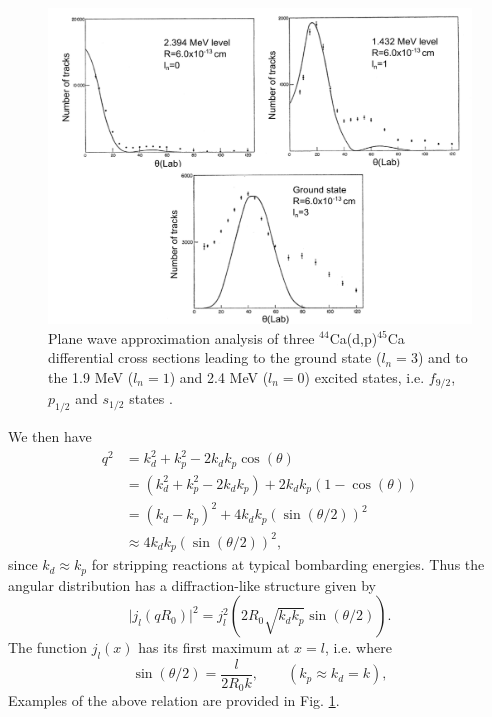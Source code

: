 \begin{figure}
\centerline{\includegraphics*[width=15cm,angle=0]{C6/figs_C6/fig6_F2}}
\caption{Plane wave approximation analysis of three $^{44}$Ca(d,p)$^{45}$Ca differential cross sections leading to the ground state ($l_n=3$) and to the 1.9 MeV  ($l_n=1$) and 2.4 MeV ($l_n=0$) excited states, i.e.  $f_{9/2}$, $p_{1/2}$ and $s_{1/2}$ states \citep{Cobb:57}.}\label{fig3}
\end{figure}

We then have
\begin{equation}\label{eq442}
 \begin{split}
  q^2&= k_d^2+k_p^2- 2 k_d k_p \cos(\theta)\\
& =(k_d^2+k_p^2- 2 k_d k_p) + 2 k_d k_p (1-\cos(\theta))\\
& =(k_d-k_p)^2+ 4 k_d k_p \left(\sin (\theta/2)\right) ^2  \\
& \approx 4 k_d k_p \left(\sin (\theta/2)\right) ^2,
\end{split}
\end{equation}
since $ k_d \approx k_p $ for stripping reactions at typical bombarding energies. Thus the angular distribution has a diffraction-like structure given by
\begin{equation}\label{eq443}
\vert j_l(qR_0) \vert ^2= j_l^2 (2R_0 \sqrt{k_d k_p} \sin (\theta/2)).
\end{equation}
The function $j_l(x)$ has its first maximum at $x=l$, i.e. where
\begin{equation}\label{eq444}
\sin (\theta/2)=\frac{l}{2 R_0 k},\quad \quad (k_p \approx  k_d=k),
\end{equation}
Examples of the above relation are provided in Fig. \ref{fig3}.

